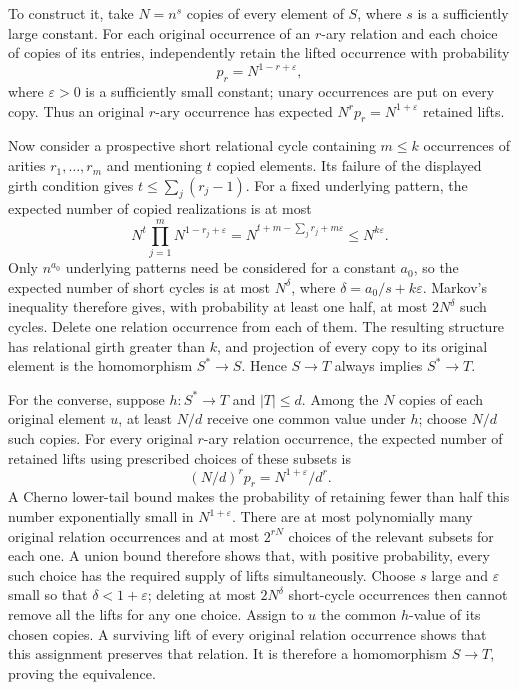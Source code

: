 To construct it, take \(N=n^s\) copies of every element of \(S\), where
\(s\) is a sufficiently large constant.  For each original occurrence of
an \(r\)-ary relation and each choice of copies of its entries, independently
retain the lifted occurrence with probability
\[
 p_r=N^{1-r+\varepsilon},
\]
where \(\varepsilon>0\) is a sufficiently small constant; unary occurrences
are put on every copy.  Thus an original \(r\)-ary occurrence has expected
\(N^r p_r=N^{1+\varepsilon}\) retained lifts.

Now consider a prospective short relational cycle containing \(m\leq k\)
occurrences of arities \(r_1,\ldots,r_m\) and mentioning \(t\) copied
elements.  Its failure of the displayed girth condition gives
\(t\leq\sum_j(r_j-1)\).  For a fixed underlying pattern, the expected
number of copied realizations is at most
\[
 N^t\prod_{j=1}^{m}N^{1-r_j+\varepsilon}
 =N^{t+m-\sum_jr_j+m\varepsilon}
 \leq N^{k\varepsilon}.
\]
Only \(n^{a_0}\) underlying patterns need be considered for a constant
\(a_0\), so the expected number of short cycles is at most
\(N^\delta\), where \(\delta=a_0/s+k\varepsilon\).  Markov's inequality
therefore gives, with probability at least one half, at most
\(2N^\delta\) such cycles.  Delete one relation occurrence from each of
them.  The resulting structure has relational girth greater than \(k\),
and projection of every copy to its original element is the homomorphism
\(S^{\ast}\to S\).  Hence \(S\to T\) always implies
\(S^{\ast}\to T\).

For the converse, suppose \(h:S^{\ast}\to T\) and
\(\lvert T\rvert\leq d\).  Among the \(N\) copies of each original
element \(u\), at least \(N/d\) receive one common value under \(h\);
choose \(N/d\) such copies.  For every original \(r\)-ary relation
occurrence, the expected number of retained lifts using prescribed choices of
these subsets is
\[
 (N/d)^r p_r=N^{1+\varepsilon}/d^r.
\]
A Cherno lower-tail bound makes the probability of retaining fewer than half
this number exponentially small in \(N^{1+\varepsilon}\).  There are at
most polynomially many original relation occurrences and at most
\(2^{rN}\) choices of the relevant subsets for each one.  A union bound
therefore shows that, with positive probability, every such choice has the
required supply of lifts simultaneously.  Choose \(s\) large and
\(\varepsilon\) small so that \(\delta<1+\varepsilon\); deleting at
most \(2N^\delta\) short-cycle occurrences then cannot remove all the
lifts for any one choice.  Assign to \(u\) the common \(h\)-value of
its chosen copies.  A surviving lift of every original relation occurrence
shows that this assignment preserves that relation.  It is therefore a
homomorphism \(S\to T\), proving the equivalence.

